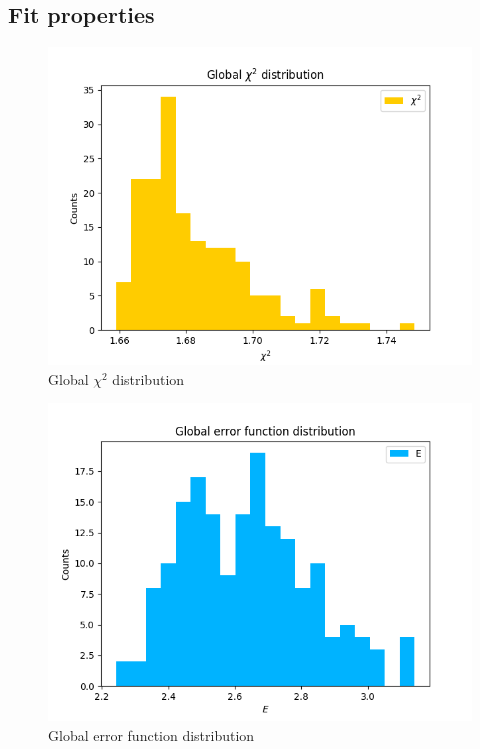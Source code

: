 \documentclass[
]{article}
\begin{document}
\hypertarget{fit-properties}{%
\subsection{Fit properties}\label{fit-properties}}

\begin{figure}
\centering
\includegraphics{pngplots/Globalchi2.png}
\caption{Global \(\chi^2\) distribution}
\end{figure}

\begin{figure}
\centering
\includegraphics{pngplots/GlobalErrorFunction.png}
\caption{Global error function distribution}
\end{figure}
\end{document}

